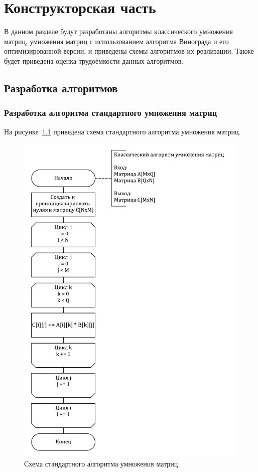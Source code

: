 \chapter{Конструкторская часть}

В данном разделе будут разработаны алгоритмы классического умножения матриц, умножения матриц с использованием алгоритма Винограда и его оптимизированной версии, и приведены схемы алгоритмов их реализации. Также будет приведена оценка трудоёмкости данных алгоритмов.

\section{Разработка алгоритмов}

\subsection{Разработка алгоритма стандартного умножения матриц}

На рисунке~\ref{img:stdMult} приведена схема стандартного алгоритма умножения матриц.

\begin{figure}[H]
	\centering
	\includegraphics[height=0.65\textheight]{images/stdMult.pdf}
	\caption{Схема стандартного алгоритма умножения матриц}
	\label{img:stdMult}
\end{figure}
\clearpage

